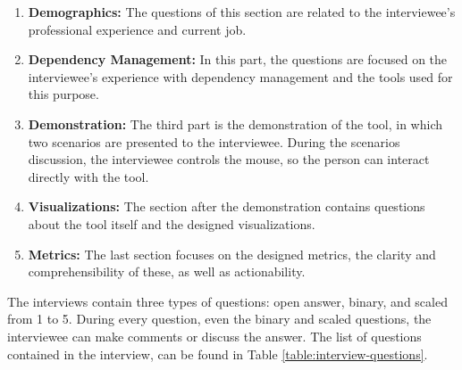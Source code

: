 \begin{enumerate}
  \item \textbf{Demographics:} The questions of this section are related to the interviewee's professional experience and current job.
  \item \textbf{Dependency Management:} In this part, the questions are focused on the interviewee's experience with dependency management and the tools used for this purpose.
  \item \textbf{Demonstration:} The third part is the demonstration of the tool, in which two scenarios are presented to the interviewee. During the scenarios discussion, the interviewee controls the mouse, so the person can interact directly with the tool.
  \item \textbf{Visualizations:} The section after the demonstration contains questions about the tool itself and the designed visualizations.
  \item \textbf{Metrics:} The last section focuses on the designed metrics, the clarity and comprehensibility of these, as well as actionability.
\end{enumerate}

The interviews contain three types of questions: open answer, binary, and scaled from 1 to 5. During every question, even the binary and scaled questions, the interviewee can make comments or discuss the answer. The list of questions contained in the interview, can be found in Table \ref{table:interview-questions}.

